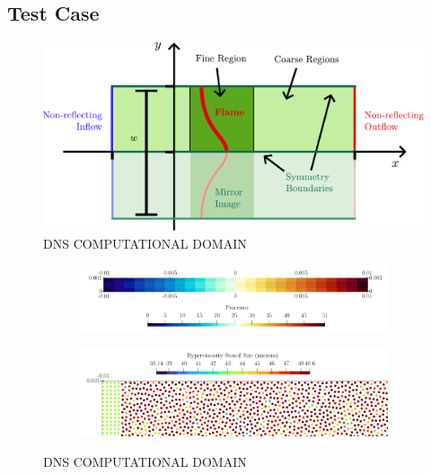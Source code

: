 \subsection{Test Case}

\begin{figure}[t]
\centering
\includegraphics[scale=0.65]{assets/imgs/DNS-computational-domain.pdf}
\caption{DNS COMPUTATIONAL DOMAIN}
\label{fig:DNS-domain}
\end{figure}

\begin{figure}[t]
\centering
    \begin{subfigure}{0.99\textwidth}
    \centering
    \includegraphics[scale=0.25]{assets/graphs/flame-sim-discretisation.png}
    \caption{}
    \label{fig:disc1}
    \end{subfigure}

\vspace*{0.5em}

    \begin{subfigure}{0.99\textwidth}
    \centering
    \includegraphics[scale=0.25]{assets/graphs/flame-sim-discretisation_zoom.png}
    \caption{}
    \label{fig:disc2}
    \end{subfigure}
\caption{DNS COMPUTATIONAL DOMAIN}
\label{fig:disc}
\end{figure}

